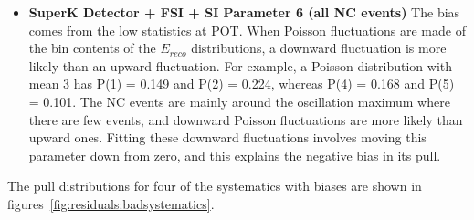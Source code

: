 \begin{itemize}
\item {\bf SuperK Detector + FSI + SI Parameter 6 (all NC events)}
   The bias comes from the low statistics at \FakePot{} POT.
   When Poisson fluctuations are made of the bin contents of the $E_{reco}$ distributions, a downward fluctuation is more likely than an upward
   fluctuation. For example, a Poisson distribution with mean 3 has P(1) = 0.149 and P(2) = 0.224, whereas P(4) = 0.168 and P(5) = 0.101. The 
   NC events are mainly around the oscillation maximum where there are few events, and downward Poisson fluctuations are more likely than upward 
   ones. Fitting these downward fluctuations involves moving this parameter down from zero, and this explains the negative bias in its pull. 
\end{itemize}
The pull distributions for four of the systematics with biases are shown in figures~\ref{fig:residuals:badsystematics}.

%
% 

